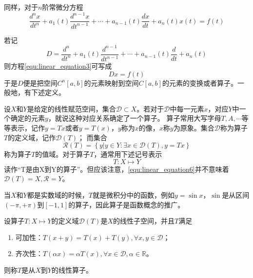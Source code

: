 \documentclass{suesreport}
\begin{document}
    同样，对于$n$阶常微分方程
    \begin{equation}
        \frac{d^{n} x}{d t^{n}}+a_{1}(t)\frac{d^{n-1} x}{d t^{n-1}}+\cdots+a_{n-1}(t)\frac{d x}{d t}+a_{n}(t)x(t)=f(t)\label{equ:linear_equation3}
    \end{equation}

    若记
    \begin{equation}
        D=\dfrac{d^{n}}{d t^{n}}+a_{1}(t)\dfrac{d^{n-1}}{d t^{n-1}}+\cdots+a_{n-1}(t)\dfrac{d}{d t}+a_{n}(t)\label{equ:linear_equation4}
    \end{equation}
    则方程\cref{equ:linear_equation3}可写成
    \begin{equation}
        Dx=f(t)\label{equ:linear_equation5}
    \end{equation}
    于是$D$便是把空间$C^{n}\left[a,b\right]$的元素映射到空间$C\left[a,b\right]$的元素的变换或者算子。一般地，有下述定义。
    \begin{definition}[算子]
        设$X$和$Y$是给定的线性赋范空间，集合$\mathcal{D}\subset{X}$。若对于$\mathcal{D}$中每一元素$x$，对应$Y$中一个确定的元素$y$，就说这种对应关系确定了一个算子。
        算子常用大写字母$T,A,\cdots$等等表示，记作$y=Tx$或者$y=T(x)$，$y$称为$x$的像，$x$称$y$为原象。集合$\mathcal{D}$称为算子$T$的定义域，记作$\mathcal{D}(T)$；
        而集合
        \begin{equation}
            \mathcal{R}(T)=\left\{y\left|y\in{Y}:\exists{x}\in{\mathcal{D}(T)},y=Tx\right.\right\}
        \end{equation}
        称为算子$T$的值域。对于算子$T$，通常用下述记号表示
        \begin{equation}
            T:X\longmapsto{Y}\label{equ:linear_equation6}
        \end{equation}
        读作“T是由X到Y的算子”。但应该注意，\cref{equ:linear_equation6}并不意味着$\mathcal{D}(T)=X,\mathcal{R}=Y$。
    \end{definition}

    当$X$和$Y$都是实数域的时候，$T$就是微积分中的函数，例如$y=\sin{x}$，$\sin$是从区间$\left(-\pi,+\pi\right)$到$\left[-1,1\right]$的算子，因此算子是函数概念的推广。
    
    \begin{definition}[线性算子]
        设算子$T:X\mapsto{Y}$的定义域$\mathcal{D}(T)$是$X$的线性子空间，并且$T$满足
        \begin{enumerate}[label=(\arabic*)]
            \item 可加性：$T(x+y)=T(x)+T(y),\forall{x,y}\in\mathcal{D}$；
            \item 齐次性：$T(\alpha{x})=\alpha{T(x)},\forall{x}\in\mathcal{D},\alpha\in\mathbb{R}$。
        \end{enumerate}
        则称$T$是从$X$到$Y$的线性算子。
    \end{definition}
    
\end{document}
